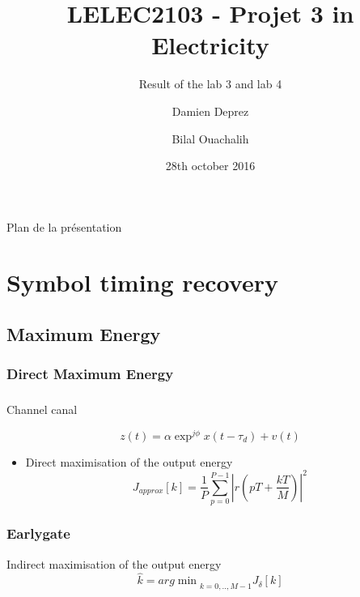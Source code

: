 \documentclass[11pt]{beamer}
\title{LELEC2103 - Projet 3 in Electricity}
\subtitle[\ldots]{Result of the lab 3 and lab 4}
\author[D. Deprez\and B. Ouachalih]{Damien Deprez\and Bilal Ouachalih}
\institute{EPL}
\date{28th october 2016}
\begin{document}
{
	\begin{frame}[noframenumbering]
		\titlepage
	\end{frame}
} 

{
	\begin{frame}[noframenumbering]{Plan de la présentation}
		\tableofcontents
	\end{frame}
}

\section{Symbol timing recovery}

\subsection{Maximum Energy}
\subsubsection{Direct Maximum Energy}
\begin{frame}
\frametitle{}

Channel canal

\begin{equation}
z(t)=\alpha\exp^{j\phi} x(t-\tau_{d})+v(t)
\label{equ1}
\end{equation}

\begin{itemize}

\item Direct maximisation of the output energy
\begin{equation}
J_{approx}[k] = \frac{1}{P} \sum \limits_{p=0}^{P-1} |r(pT+\frac{kT}{M})|^2
\label{equ1}
\end{equation}


\end{itemize}

\end{frame}

\subsubsection{Earlygate}

\begin{frame}

Indirect maximisation of the output energy
\begin{equation}
\hat{k}= {arg\min}_{k=0,..,M-1} J_{\delta}[k]
\end{equation}

\end{frame}
\end{document}
